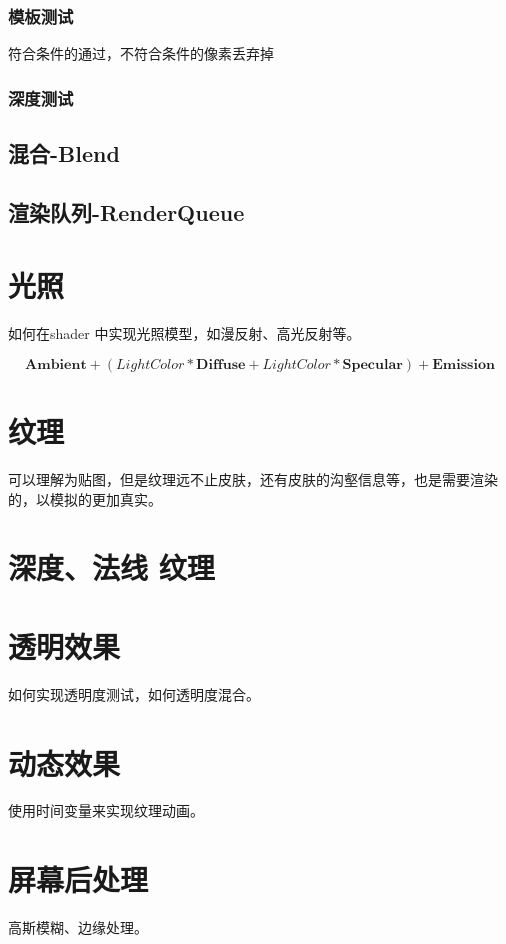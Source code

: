 \documentclass[UTF8,a4paper,12pt]{ctexbook}
\begin{document}
			
		\subsection{模板测试}
			符合条件的通过，不符合条件的像素丢弃掉
			
			
		\subsection{深度测试}
		
	\section{混合-Blend}
	
	
	\section{渲染队列-RenderQueue}
	
			
\chapter{光照}
	如何在shader 中实现光照模型，如漫反射、高光反射等。

	$$\mathbf{Ambient} + (Light Color * \mathbf{Diffuse} + Light  Color* \mathbf{Specular}) + \mathbf{Emission}$$

\chapter{纹理}
	可以理解为贴图，但是纹理远不止皮肤，还有皮肤的沟壑信息等，也是需要渲染的，以模拟的更加真实。

\chapter{深度、法线 纹理}
	


\chapter{透明效果}
	如何实现透明度测试，如何透明度混合。


\chapter{动态效果}
	使用时间变量来实现纹理动画。


\chapter{屏幕后处理}
	高斯模糊、边缘处理。
\end{document}
